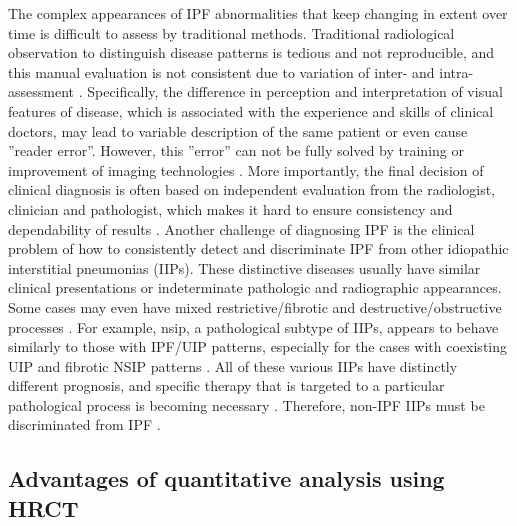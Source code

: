 The complex appearances of IPF abnormalities that keep changing in extent over time is difficult to assess by traditional methods. Traditional radiological observation to distinguish disease patterns is tedious and not reproducible, and this manual evaluation is not consistent due to variation of inter- and intra- assessment \citep{flaherty2007idiopathic, watadani2013interobserver}. Specifically, the difference in perception and interpretation of visual features of disease, which is associated with the experience and skills of clinical doctors, may lead to variable description of the same patient or even cause ''reader error''. However, this ''error'' can not be fully solved by training or improvement of imaging technologies \citep{kundel2006history,bartholmai2013quantitative}. More importantly, the final decision of clinical diagnosis is often based on independent evaluation from the radiologist, clinician and pathologist, which makes it hard to ensure consistency and dependability of results  \citep{flaherty2004idiopathic,sverzellati2011method}. Another challenge of diagnosing IPF is the clinical problem of how to consistently detect and discriminate IPF from other idiopathic interstitial pneumonias (IIPs). These distinctive diseases usually have similar clinical presentations or indeterminate pathologic and radiographic appearances. Some cases may even have mixed restrictive/fibrotic and destructive/obstructive processes \citep{bartholmai2013quantitative}. For example, \gls{nsip}, a pathological subtype of IIPs, appears to behave similarly to those with IPF/UIP patterns, especially for the cases with coexisting UIP and fibrotic NSIP patterns \citep{monaghan2004prognostic, flaherty2001histopathologic}. All of these various IIPs have distinctly different prognosis, and specific therapy that is targeted to a particular pathological process is becoming necessary \citep{lynch2005high}. Therefore, non-IPF IIPs must be discriminated from IPF \citep{bjoraker1998prognostic}. 

\subsection{Advantages of quantitative analysis using HRCT} \label{Advantages}

